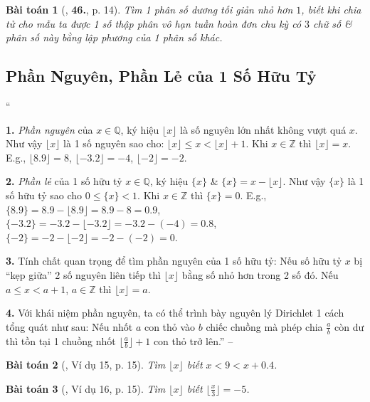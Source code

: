 \documentclass{article}
\numberwithin{equation}{section}
\newtheorem{baitoan}{Bài toán}[section]
\begin{document}
\begin{baitoan}[\cite{Tuyen_Toan_7}, \textbf{46.}, p. 14]
	Tìm 1 phân số dương tối giản nhỏ hơn $1$, biết khi chia tử cho mẫu ta được 1 số thập phân vô hạn tuần hoàn đơn chu kỳ có $3$ chữ số \& phân số này bằng lập phương của 1 phân số khác.
\end{baitoan}


\subsection{Phần Nguyên, Phần Lẻ của 1 Số Hữu Tỷ}
``\begin{enumerate*}
	\item[\textbf{1.}] \textit{Phần nguyên} của $x\in\mathbb{Q}$, ký hiệu $\lfloor x\rfloor$ là số nguyên lớn nhất không vượt quá $x$. Như vậy $\lfloor x\rfloor$ là 1 số nguyên sao cho: $\lfloor x\rfloor\le x < \lfloor x\rfloor + 1$. Khi $x\in\mathbb{Z}$ thì $\lfloor x\rfloor = x$. E.g., $\lfloor 8.9\rfloor = 8$, $\lfloor-3.2\rfloor = -4$, $\lfloor-2\rfloor = -2$.
	\item[\textbf{2.}] \textit{Phần lẻ} của 1 số hữu tỷ $x\in\mathbb{Q}$, ký hiệu $\{x\}$ \& $\{x\} = x - \lfloor x\rfloor$. Như vậy $\{x\}$ là 1 số hữu tỷ sao cho $0\le\{x\} < 1$. Khi $x\in\mathbb{Z}$ thì $\{x\} = 0$. E.g., $\{8.9\} = 8.9 - \lfloor 8.9\rfloor = 8.9 - 8 = 0.9$, $\{-3.2\} = -3.2 - \lfloor-3.2\rfloor = -3.2 -(-4) = 0.8$, $\{-2\} = -2 - \lfloor-2\rfloor = -2 -(-2) = 0$.
	\item[\textbf{3.}] Tính chất quan trọng để tìm phần nguyên của 1 số hữu tỷ: Nếu số hữu tỷ $x$ bị ``kẹp giữa'' 2 số nguyên liên tiếp thì $\lfloor x\rfloor$ bằng số nhỏ hơn trong 2 số đó. Nếu $a\le x < a + 1$, $a\in\mathbb{Z}$ thì $\lfloor x\rfloor = a$.
	\item[\textbf{4.}] Với khái niệm phần nguyên, ta có thể trình bày nguyên lý Dirichlet 1 cách tổng quát như sau: Nếu nhốt $a$ con thỏ vào $b$ chiếc chuồng mà phép chia $\frac{a}{b}$ còn dư thì tồn tại 1 chuồng nhốt $\lfloor\frac{a}{b}\rfloor + 1$ con thỏ trở lên.'' -- \cite[\S6, pp. 14--15]{Tuyen_Toan_7}
\end{enumerate*}

\begin{baitoan}[\cite{Tuyen_Toan_7}, Ví dụ 15, p. 15]
	Tìm $\lfloor x\rfloor$ biết $x < 9 < x + 0.4$.
\end{baitoan}

\begin{baitoan}[\cite{Tuyen_Toan_7}, Ví dụ 16, p. 15]
	Tìm $\lfloor x\rfloor$ biết $\lfloor\frac{x}{3}\rfloor = -5$.
\end{baitoan}
\end{document}
